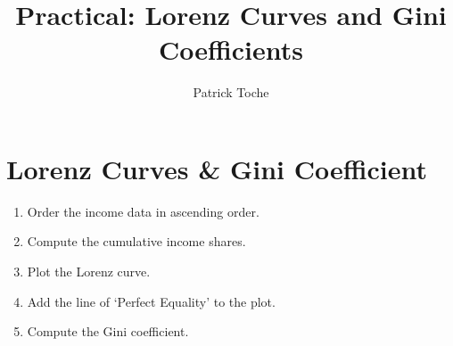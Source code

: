 \documentclass[a4,12pt]{article}%
\title{Practical: Lorenz Curves and Gini Coefficients}
\author{Patrick Toche}
\begin{document}
\maketitle

\newpage

\section*{Lorenz Curves \& Gini Coefficient}

\begin{enumerate}

\item 
Order the income data in ascending order.

\item 
Compute the cumulative income shares.

\item 
Plot the Lorenz curve.

\item
Add the line of `Perfect Equality' to the plot.

\item 
Compute the Gini coefficient.

\end{enumerate}
\end{document}
